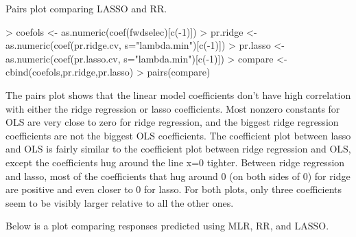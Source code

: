 \documentclass{article}
\begin{document}
Pairs plot comparing LASSO and RR.
\begin{Schunk}
\begin{Sinput}
> coefols <- as.numeric(coef(fwdselec)[c(-1)])
> pr.ridge <- as.numeric(coef(pr.ridge.cv, s="lambda.min")[c(-1)])
> pr.lasso <- as.numeric(coef(pr.lasso.cv, s="lambda.min")[c(-1)])
> compare <- cbind(coefols,pr.ridge,pr.lasso)
> pairs(compare)
\end{Sinput}
\end{Schunk}

The pairs plot shows that the linear model coefficients don’t have high correlation
with either the ridge regression or lasso coefficients. Most nonzero constants for OLS are very close to zero for ridge regression, and the biggest ridge regression coefficients are not the biggest OLS coefficients. The coefficient plot between lasso and OLS is fairly similar to the coefficient plot between ridge regression and OLS, except the coefficients hug around the line x=0 tighter. Between ridge regression and lasso, most of the coefficients that hug around 0 (on both sides of 0) for ridge are positive and even closer to 0 for lasso. For both plots, only three coefficients seem to be visibly larger relative to all the other ones.

Below is a plot comparing responses predicted using MLR, RR, and LASSO. 
\end{document}
